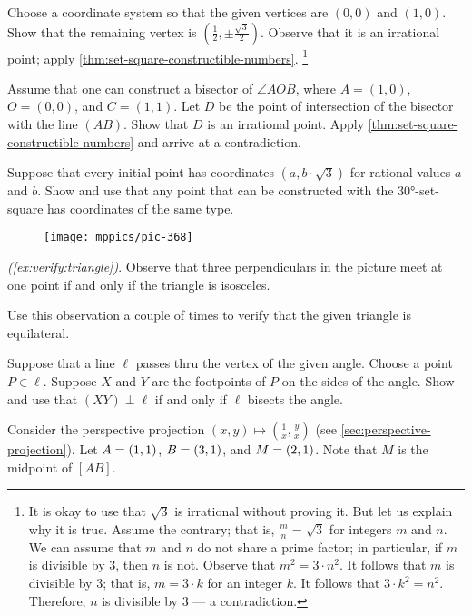 Choose a coordinate system so that the given vertices are $(0,0)$ and $(1,0)$.
Show that the remaining vertex is $(\tfrac12,\pm\tfrac{\sqrt{3}}2)$.
Observe that it is an irrational point; apply \ref{thm:set-square-constructible-numbers}.%
\footnote{It is okay to use that $\sqrt{3}$ is irrational without proving it.
But let us explain why it is true. 
Assume the contrary; that is, $\tfrac mn=\sqrt{3}$ for integers $m$ and $n$.
We can assume that $m$ and $n$ do not share a prime factor; in particular, if $m$ is divisible by $3$, then $n$ is not.
Observe that $m^2=3\cdot n^2$.
It follows that $m$ is divisible by 3; that is, $m=3\cdot k$ for an integer $k$.
It follows that $3\cdot k^2=n^2$.
Therefore, $n$ is divisible by 3 --- a contradiction.} 

Assume that one can construct a bisector of $\angle AOB$, where $A=(1,0)$, $O=(0,0)$, and $C=(1,1)$.
Let $D$ be the point of intersection of the bisector with the line $(AB)$.
Show that $D$ is an irrational point.
Apply \ref{thm:set-square-constructible-numbers} and arrive at a contradiction.

Suppose that every initial point has coordinates $(a,b\cdot\sqrt{3})$ for rational values $a$ and $b$.
Show and use that any point that can be constructed with the 30°-set-square has coordinates of the same type.

\begin{wrapfigure}[7]{r}{21mm}
\vskip-6mm
\centering
\texttt{[image: mppics/pic-368]}
\end{wrapfigure}

\parbf{\ref{ex:equilateral triangle-verify},} \textit{(\ref{ex:verify:triangle})}.
Observe that three perpendiculars in the picture meet at one point if and only if the triangle is isosceles.

Use this observation a couple of times to verify that the given triangle is equilateral.


Suppose that a line $\ell$ passes thru the vertex of the given angle.
Choose a point $P\in \ell$.
Suppose $X$ and $Y$ are the footpoints of $P$ on the sides of the angle.
Show and use that $(XY)\perp \ell$ if and only if $\ell$ bisects the angle.

Consider the perspective projection 
$(x,y)\mapsto (\tfrac 1x,\tfrac yx)$ (see \ref{sec:perspective-projection}).
Let $A=(1,1)$, $B=(3,1)$, and $M=(2,1)$.
Note that $M$ is the midpoint of $[AB]$.

